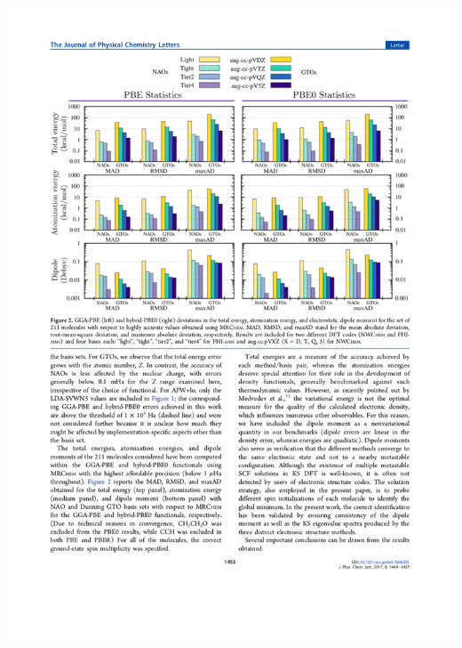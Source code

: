 \begin{frame}
\begin{center}
	\includegraphics[scale=0.90, clip, viewport = 50 530 305 732]{figures/elephant_molecules.pdf}
    \end{center}
\end{frame}

